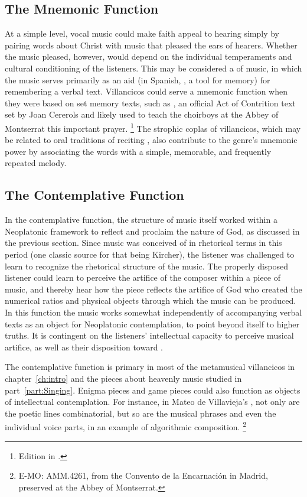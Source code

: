 \subsection{The Mnemonic Function}

At a simple level, vocal music could make faith appeal to hearing simply by pairing words about Christ with music that pleased the ears of hearers.
Whether the music pleased, however, would depend on the individual temperaments and cultural conditioning of the listeners.
This may be considered a  of music, in which the music serves primarily as an aid (in Spanish, , a tool for memory) for remembering a verbal text.
Villancicos could serve a mnemonic function when they were based on set memory texts, such as , an official Act of Contrition text set by Joan Cererols and likely used to teach the choirboys at the Abbey of Montserrat this important prayer.%
	\footnote{%
	Edition in \autocite{Cererols:MEM-VC}. %
	}
The strophic coplas of villancicos, which may be related to oral traditions of reciting , also contribute to the genre's mnemonic power by associating the words with a simple, memorable, and frequently repeated melody.

\subsection{The Contemplative Function}

In the contemplative function, the structure of music itself worked within a Neoplatonic framework to reflect and proclaim the nature of God, as discussed in the previous section.
Since music was conceived of in rhetorical terms in this period (one classic source for that being Kircher), the listener was challenged to learn to recognize the rhetorical structure of the music.
The properly disposed listener could learn to perceive the artifice of the composer within a piece of music, and thereby hear how the piece reflects the artifice of God who created the numerical ratios and physical objects through which the music can be produced.
In this function the music works somewhat independently of accompanying verbal texts as an object for Neoplatonic contemplation, to point beyond itself to higher truths.
It is contingent on the listeners' intellectual capacity to perceive musical artifice, as well as their disposition toward .

The contemplative function is primary in most of the metamusical villancicos in chapter~\ref{ch:intro} and the pieces about heavenly music studied in part~\ref{part:Singing}.
Enigma pieces and game pieces could also function as objects of intellectual contemplation.
For instance, in Mateo de Villavieja's , not only are the poetic lines combinatorial, but so are the musical phrases and even the individual voice parts, in an example of algorithmic composition.%
	\footnote{%
	E-MO: AMM.4261, from the Convento de la Encarnación in Madrid, preserved at the Abbey of Montserrat.
	}

